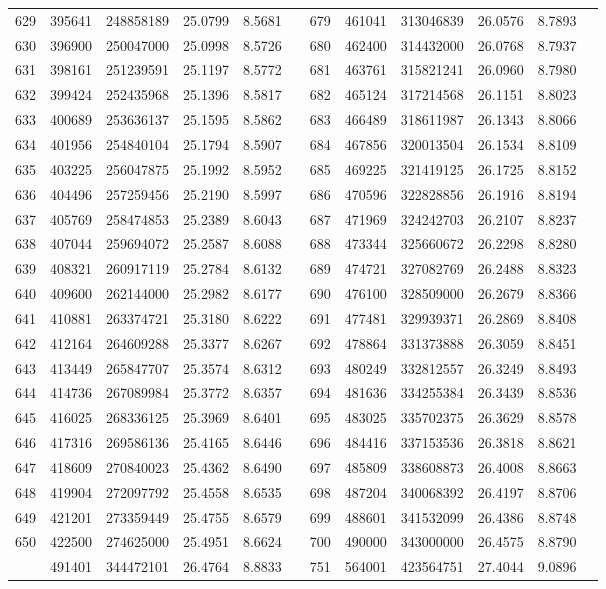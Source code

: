 \begin{longtable}{SSSSSSSSSSSS}
629&395641&248858189&25.0799&8.5681&&679&461041&313046839&26.0576&8.7893\\
630&396900&250047000&25.0998&8.5726&&680&462400&314432000&26.0768&8.7937\\
631&398161&251239591&25.1197&8.5772&&681&463761&315821241&26.0960&8.7980\\
632&399424&252435968&25.1396&8.5817&&682&465124&317214568&26.1151&8.8023\\
633&400689&253636137&25.1595&8.5862&&683&466489&318611987&26.1343&8.8066\\
634&401956&254840104&25.1794&8.5907&&684&467856&320013504&26.1534&8.8109\\
635&403225&256047875&25.1992&8.5952&&685&469225&321419125&26.1725&8.8152\\
636&404496&257259456&25.2190&8.5997&&686&470596&322828856&26.1916&8.8194\\
637&405769&258474853&25.2389&8.6043&&687&471969&324242703&26.2107&8.8237\\
638&407044&259694072&25.2587&8.6088&&688&473344&325660672&26.2298&8.8280\\
639&408321&260917119&25.2784&8.6132&&689&474721&327082769&26.2488&8.8323\\
640&409600&262144000&25.2982&8.6177&&690&476100&328509000&26.2679&8.8366\\
641&410881&263374721&25.3180&8.6222&&691&477481&329939371&26.2869&8.8408\\
642&412164&264609288&25.3377&8.6267&&692&478864&331373888&26.3059&8.8451\\
643&413449&265847707&25.3574&8.6312&&693&480249&332812557&26.3249&8.8493\\
644&414736&267089984&25.3772&8.6357&&694&481636&334255384&26.3439&8.8536\\
645&416025&268336125&25.3969&8.6401&&695&483025&335702375&26.3629&8.8578\\
646&417316&269586136&25.4165&8.6446&&696&484416&337153536&26.3818&8.8621\\
647&418609&270840023&25.4362&8.6490&&697&485809&338608873&26.4008&8.8663\\
648&419904&272097792&25.4558&8.6535&&698&487204&340068392&26.4197&8.8706\\
649&421201&273359449&25.4755&8.6579&&699&488601&341532099&26.4386&8.8748\\
650&422500&274625000&25.4951&8.6624&&700&490000&343000000&26.4575&8.8790\\
&491401&344472101&26.4764&8.8833&&751&564001&423564751&27.4044&9.0896\\

\end{longtable}
